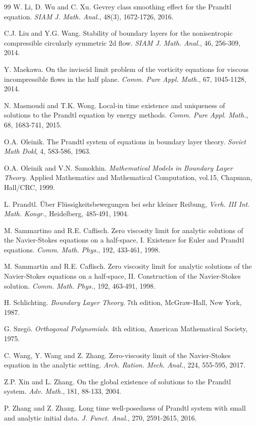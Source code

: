 \documentclass{amsart}
\numberwithin{equation}{section}
\begin{document}
\begin{thebibliography}{99}
W. Li, D. Wu and C. Xu. Gevrey class smoothing effect for the Prandtl equation. {\it SIAM J. Math. Anal.}, 48(3), 1672-1726, 2016.

C.J. Liu and Y.G. Wang. Stability of boundary layers for the nonisentropic compressible circularly symmetric 2d flow. {\it SIAM  J.  Math.  Anal.}, 46, 256-309, 2014.



Y. Maekawa. On the inviscid limit problem of the vorticity equations for viscous incompressible flows in the half plane. {\it Comm.  Pure  Appl. Math.}, 67, 1045-1128, 2014.


N. Masmoudi and T.K. Wong. Local-in time existence and uniqueness of solutions to the Prandtl equation by energy methods. {\it Comm. Pure Appl. Math.}, 68, 1683-741, 2015.



O.A. Oleinik. The Prandtl system of equations in boundary layer theory.  {\it Soviet Math Dokl}, 4, 583-586, 1963.

O.A. Oleinik and V.N. Samokhin. {\it Mathematical Models in Boundary Layer Theory.} Applied Mathematics and Mathematical Computation, vol.15, Chapman, Hall/CRC, 1999.



L. Prandtl. \"{U}ber Fl\"{u}ssigkeitsbewegungen bei sehr kleiner Reibung, {\it Verh. III Int. Math. Kongr.}, Heidelberg, 485-491, 1904.

M. Sammartino and R.E. Caflisch. Zero viscosity limit for analytic solutions of the Navier-Stokes equations on a half-space, I. Existence for Euler and Prandtl equations. {\it Comm. Math. Phys.}, 192, 433-461, 1998.

M. Sammartin and R.E. Caflisch. Zero viscosity limit for analytic solutions of the Navier-Stokes equations on a half-space, II. Construction of the Navier-Stokes solution. {\it Comm. Math. Phys.}, 192, 463-491, 1998.


H. Schlichting. {\it Boundary Layer Theory}. 7th edition, McGraw-Hall, New York, 1987.


G. Szeg\"{o}. {\it Orthogonal Polynomials}. 4th edition, American Mathematical Society, 1975.


C. Wang, Y. Wang and Z. Zhang. Zero-viscosity limit of the Navier-Stokes equation in the analytic setting. {\it Arch. Ration. Mech. Anal.}, 224, 555-595, 2017.

Z.P. Xin and L. Zhang. On the global existence of solutions to the Prandtl system. {\it Adv. Math.}, 181, 88-133, 2004.

P. Zhang and Z. Zhang. Long time well-posedness of Prandtl system with small and analytic initial data. {\it J. Funct. Anal.}, 270, 2591-2615, 2016.

\end{thebibliography}
\end{document}

